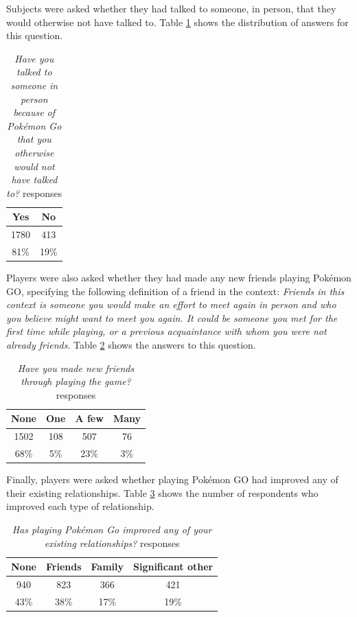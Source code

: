 Subjects were asked whether they had talked to someone, in person, that they would otherwise not have talked to. Table \ref{tbl:talk-to-strangers} shows the distribution of answers for this question.

\begin{table}[h]
	\centering
	\caption{\emph{Have you talked to someone in person because of Pokémon Go that you otherwise would not have talked to?} responses}
	\label{tbl:talk-to-strangers}
	\begin{tabular}{|c|c|}
		\hline
		\textbf{Yes}	& \textbf{No}\\
		\hline\hline
		1780			& 413\\
		81\%			& 19\%\\\hline
	\end{tabular}
\end{table}

Players were also asked whether they had made any new friends playing Pokémon GO, specifying the following definition of a friend in the context: \emph{Friends in this context is someone you would make an effort to meet again in person and who you believe might want to meet you again. It could be someone you met for the first time while playing, or a previous acquaintance with whom you were not already friends}. Table \ref{tbl:new-friends} shows the answers to this question.

\begin{table}[h]
	\centering
	\caption{\emph{Have you made new friends through playing the game?} responses}
	\label{tbl:new-friends}
	\begin{tabular}{|c|c|c|c|}
		\hline
		\textbf{None}	& \textbf{One}	& \textbf{A few}	& \textbf{Many}\\
		\hline\hline
		1502			& 108			& 507				& 76\\
		68\%			& 5\%			& 23\%				& 3\%\\\hline
	\end{tabular}
\end{table}

Finally, players were asked whether playing Pokémon GO had improved any of their existing relationships. Table \ref{tbl:existing-relationships} shows the number of respondents who improved each type of relationship.

\begin{table}[h]
	\centering
	\caption{\emph{Has playing Pokémon Go improved any of your existing relationships?} responses}
	\label{tbl:existing-relationships}
	\begin{tabular}{|c|c|c|c|}
		\hline
		\textbf{None} & \textbf{Friends}& \textbf{Family}	& \textbf{Significant other}\\
		\hline\hline
		940			& 823				& 366				& 421\\
		43\%		& 38\%				& 17\%				& 19\%\\\hline
	\end{tabular}
\end{table}

